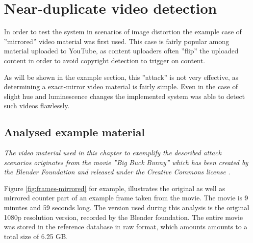 \section{Near-duplicate video detection}
\label{sec:mirrored-video-detection}
In order to test the system in scenarios of image distortion the example case of ''mirrored'' video material was first used. This case is fairly popular among material uploaded to YouTube, as content uploaders often ''flip'' the uploaded content in order to avoid copyright detection to trigger on content.

As will be shown in the example section, this ''attack'' is not very effective, as determining a exact-mirror video material is fairly simple. Even in the case of slight hue and luminescence changes the implemented system was able to detect such videos flawlessly.

\subsection{Analysed example material}
\textit{The video material used in this chapter to exemplify the described attack scenarios originates from the movie ''\textit{Big Buck Bunny}'' \cite{big-buck-bunny} which has been created by the Blender Foundation \cite{blender-foundation} and released under the Creative Commons license \cite{creative-commons}.}

Figure \ref{fig:frames-mirrored} for example, illustrates the original as well as mirrored counter part of an example frame taken from the movie. The movie is 9 minutes and 59 seconds long. The version used during this analysis is the original 1080p resolution version, recorded by the Blender foundation. The entire movie was stored in the reference database in raw format, which amounts amounts to a total size of 6.25 GB.


